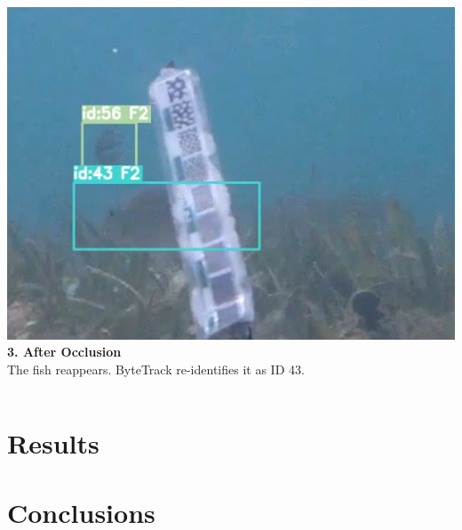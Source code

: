 \documentclass[serif]{beamer}  %
\begin{document}
\begin{frame}
\begin{columns}[T,totalwidth=\textwidth]
        \begin{column}{0.32\textwidth}
            \centering
            \includegraphics[width=\linewidth]{images/occlusion_3.png}
            \vspace{0.5em}
            \tiny
            \textbf{3. After Occlusion} \\
            The fish reappears. ByteTrack re-identifies it as ID 43.
        \end{column}
    \end{columns}
\end{frame}


\section{Results}

\section{Conclusions}
\end{document}

